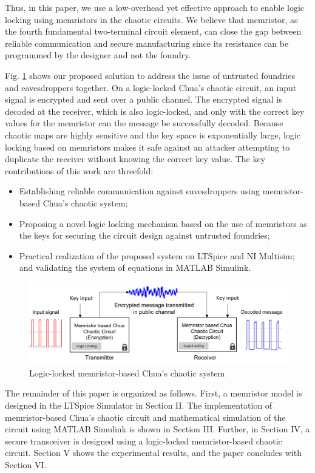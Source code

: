 Thus, in this paper, we use a low-overhead yet effective approach to enable logic locking using memristors \cite{chua1971memristor} in the chaotic circuits. We believe that memristor, as the fourth fundamental two-terminal circuit element, can close the gap between reliable communication and secure manufacturing since its resistance can be programmed by the designer and not the foundry.

Fig. \ref{fig:Logic-locked} shows our proposed solution to address the issue of untrusted foundries and eavesdroppers together. On a logic-locked Chua's chaotic circuit, an input signal is encrypted and sent over a public channel. The encrypted signal is decoded at the receiver, which is also logic-locked, and only with the correct key values for the memristor can the message be successfully decoded. Because chaotic maps are highly sensitive and the key space is exponentially large, logic locking based on memristors makes it safe against an attacker attempting to duplicate the receiver without knowing the correct key value. The key contributions of this work are threefold:
\begin{itemize}
   \item Establishing reliable communication against eavesdroppers using memristor-based Chua's chaotic system;
    \item Proposing a novel logic locking mechanism based on the use of memristors as the keys for securing the circuit design against untrusted foundries;
    \item Practical realization of the proposed system on LTSpice and NI Multisim; and validating the system of equations in MATLAB Simulink.
\end{itemize}

\begin{figure}[!t]
    \centering
    \includegraphics[width = 1\linewidth]{figs/Fig1introductionV2.png}
    \caption{Logic-locked memristor-based Chua's chaotic system}
    \label{fig:Logic-locked}
\end{figure}

The remainder of this paper is organized as follows. First, a memristor model is designed in the LTSpice Simulator in Section II. The implementation of memristor-based Chua's chaotic circuit and mathematical simulation of the circuit using MATLAB Simulink is shown in Section III. Further, in Section IV, a secure transceiver is designed using a logic-locked memristor-based chaotic circuit. Section V shows the experimental results, and the paper concludes with Section VI.

